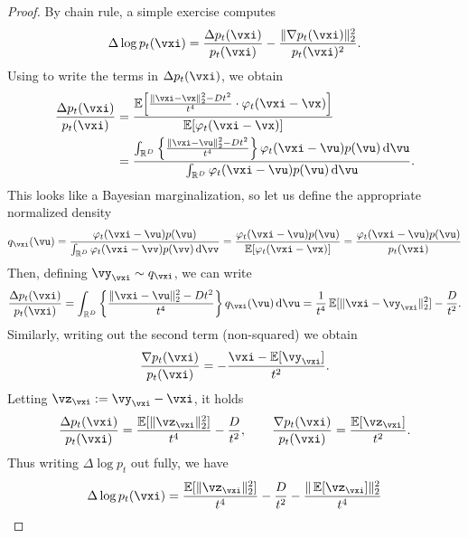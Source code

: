 \documentclass[../../book-main.tex]{subfiles}
\begin{document}
\begin{proof}
    By chain rule, a simple exercise computes 
    \begin{equation}
        \Delta \log p_{t}(\vxi) = \frac{\Delta p_{t}(\vxi)}{p_{t}(\vxi)} - \frac{\norm{\nabla p_{t}(\vxi)}_{2}^{2}}{p_{t}(\vxi)^{2}}.
    \end{equation}
    Using  to write the terms in \(\Delta p_{t}(\vxi)\), we obtain
    \begin{align}
        \frac{\Delta p_{t}(\vxi)}{p_{t}(\vxi)}
        &= \frac{\Ex\rs{\frac{\norm{\vxi - \vx}_{2}^{2} - Dt^{2}}{t^{4}} \cdot \phi_{t}(\vxi - \vx)}}{\Ex[\phi_{t}(\vxi - \vx)]} \\
        &= \frac{\int_{\R^{D}}\bc{\frac{\norm{\vxi - \vu}_{2}^{2} - Dt^{2}}{t^{4}}}\phi_{t}(\vxi - \vu)p(\vu)\odif{\vu}}{\int_{\R^{D}}\phi_{t}(\vxi - \vu)p(\vu)\odif{\vu}}.
    \end{align}
    This looks like a Bayesian marginalization, so let us define the appropriate normalized density
    \begin{equation}
        q_{\vxi}(\vu) = \frac{\phi_{t}(\vxi - \vu)p(\vu)}{\int_{\R^{D}}\phi_{t}(\vxi - \vv)p(\vv)\odif{\vv}} = \frac{\phi_{t}(\vxi - \vu)p(\vu)}{\Ex[\phi_{t}(\vxi - \vx)]} = \frac{\phi_{t}(\vxi - \vu)p(\vu)}{p_{t}(\vxi)}
    \end{equation}
    Then, defining \(\vy_{\vxi} \sim q_{\vxi}\), we can write 
    \begin{equation}
        \frac{\Delta p_{t}(\vxi)}{p_{t}(\vxi)} = \int_{\R^{D}}\bc{\frac{\norm{\vxi - \vu}_{2}^{2} - Dt^{2}}{t^{4}}}q_{\vxi}(\vu)\odif{\vu} = \frac{1}{t^{4}}\Ex[\norm{\vxi - \vy_{\vxi}}_{2}^{2}] - \frac{D}{t^{2}}.
    \end{equation}
    Similarly, writing out the second term (non-squared) we obtain
    \begin{equation}
        \frac{\nabla p_{t}(\vxi)}{p_{t}(\vxi)} = -\frac{\vxi - \Ex[\vy_{\vxi}]}{t^{2}}.
    \end{equation}
    Letting \(\vz_{\vxi} := \vy_{\vxi} - \vxi\), it holds 
    \begin{equation}
        \frac{\Delta p_{t}(\vxi)}{p_{t}(\vxi)} = \frac{\Ex[\norm{\vz_{\vxi}}_{2}^{2}]}{t^{4}} - \frac{D}{t^{2}}, \qquad \frac{\nabla p_{t}(\vxi)}{p_{t}(\vxi)} = \frac{\Ex[\vz_{\vxi}]}{t^{2}}.
    \end{equation}
    Thus writing \(\Delta \log p_{t}\) out fully, we have 
    \begin{align}
        \Delta \log p_{t}(\vxi)
        &= \frac{\Ex[\norm{\vz_{\vxi}}_{2}^{2}]}{t^{4}} - \frac{D}{t^{2}} - \frac{\norm{\Ex[\vz_{\vxi}]}_{2}^{2}}{t^{4}} \\

\end{align}
\end{proof}
\end{document}
